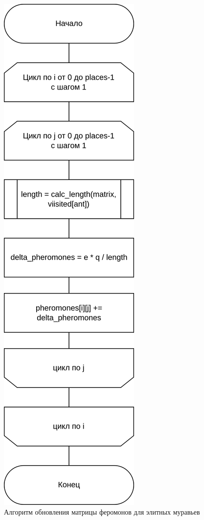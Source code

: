 \begin{figure}[h]
	\centering
	\includegraphics[height=0.85\textheight]{imgs/ant_elite_phero.drawio}
	\caption{Алгоритм обновления матрицы феромонов для элитных муравьев}
	\label{fig:update_elite}
\end{figure}

